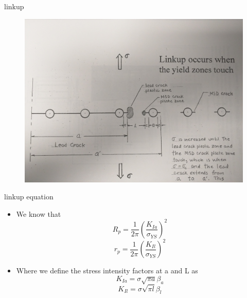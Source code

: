 \documentclass[10pt]{beamer}
\begin{document}
\begin{frame}{linkup}
\begin{figure}
\centering
\includegraphics[width=0.7\linewidth]{msd}
\label{fig:msd}
\end{figure}
\end{frame}


\begin{frame}{linkup equation}
	\begin{itemize}[<+->]
		\item We know that
		\begin{equation}
		R_p = \frac{1}{2\pi}\left(\frac{K_{Ia}}{\sigma_{YS}}\right)^2
		\end{equation}
		\begin{equation}
		r_p = \frac{1}{2\pi}\left(\frac{K_{Il}}{\sigma_{YS}}\right)^2
		\end{equation}
		\item Where we define the stress intensity factors at a and L as
		\begin{equation}
		K_{Ia} = \sigma \sqrt{\pi a} \beta_a
		\end{equation}
		\begin{equation}
		K_{Il} = \sigma \sqrt{\pi l} \beta_l
		\end{equation}
	\end{itemize}
\end{frame}
\end{document}
